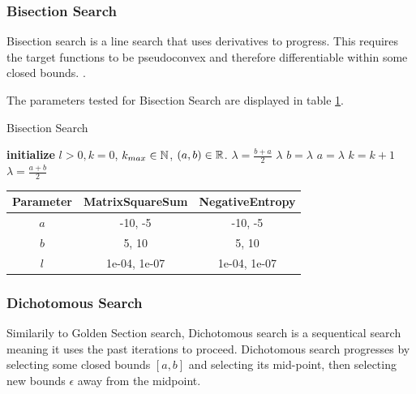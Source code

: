 \documentclass[a4paper,english,titlepage,12pt]{article}
\newcommand{\abs}[1]{\ensuremath|#1|}
\newcommand{\R}{\ensuremath\mathbb{R}}
\newcommand{\N}{\ensuremath\mathbb{N}}
\begin{document}
\subsubsection{Bisection Search}


Bisection search is a line search that uses derivatives to progress. This requires the target functions to be pseudoconvex and therefore differentiable within some closed bounds. \cite{book:nonlinear_programming}.

The parameters tested for Bisection Search are displayed in table \ref{tab:params_BisectionSearch}.

\begin{algorithm}[H]
\caption{Bisection Search}
\label{alg_bisection}
\begin{algorithmic}[1]
\STATE \textbf{initialize} $l > 0, k = 0$, $k_{max} \in \N$, $(a, b) \in \R$.
\WHILE{$\abs{b - a} > l$ \AND $k < k_{max}$}
    \STATE $\lambda = \frac{b + a}{2}$
        \RETURN $\lambda$
        \STATE $b = \lambda$
    \ELSE
        \STATE $a = \lambda$
    \ENDIF
    \STATE $k = k + 1$
\ENDWHILE
\RETURN $\lambda = \frac{a + b}{2}$
\end{algorithmic}
\end{algorithm}

\begin{table}[H]
\label{tab:params_BisectionSearch}
\centering
{}
\begin{tabular}{|c|c|c|}
\hline
\rowcolor{gray!25}
Parameter & MatrixSquareSum & NegativeEntropy \\
\hline
$a$ & -10, -5 & -10, -5 \\
$b$ & 5, 10 & 5, 10 \\
$l$ & 1e-04, 1e-07 & 1e-04, 1e-07 \\
\hline
\end{tabular}
\end{table}


\subsubsection{Dichotomous Search}


Similarily to Golden Section search, Dichotomous search is a sequentical search meaning it uses the past iterations to proceed. Dichotomous search progresses by selecting some closed bounds $[a, b]$ and selecting its mid-point, then selecting new bounds $\epsilon$ away from the midpoint. \cite{book:nonlinear_programming}
\end{document}
